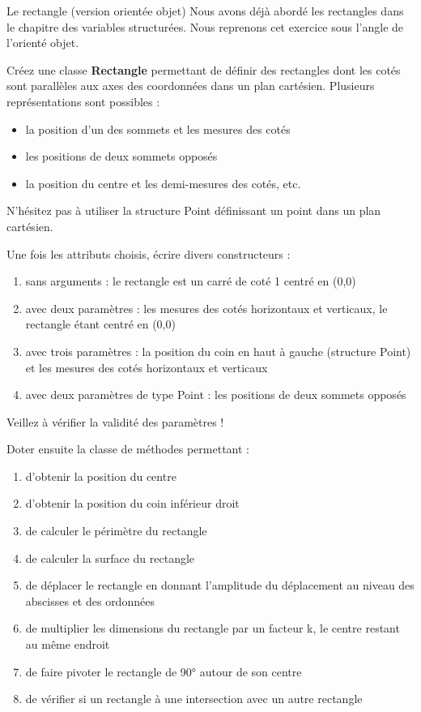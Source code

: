 \begin{Exercice}{Le rectangle (version orientée objet)}
	Nous avons déjà abordé les rectangles dans le chapitre des variables
	structurées. Nous reprenons cet exercice sous l’angle de l’orienté
	objet.

	Créez une classe \textbf{Rectangle}
	permettant de définir des rectangles dont les cotés sont parallèles aux
	axes des coordonnées dans un plan cartésien. Plusieurs représentations
	sont possibles :

	\liststyleListi
	\begin{itemize}
		\item 
			la position d’un des sommets et les mesures des cotés
		\item 
			les positions de deux sommets opposés
		\item 
			la position du centre et les demi-mesures des cotés, etc.
	\end{itemize}

	N’hésitez pas à utiliser la structure Point définissant un point dans un
	plan cartésien.

	Une fois les attributs choisis, écrire divers constructeurs :

	\begin{enumerate}[label=\alph*)]
		\item 
			sans arguments : le rectangle est un carré de coté 1 centré en (0,0)
		\item
			avec deux paramètres : les mesures des cotés horizontaux et verticaux,
			le rectangle étant centré en (0,0)
		\item 
			avec trois paramètres : la position du coin en haut à gauche (structure
			Point) et les mesures des cotés horizontaux et verticaux 
		\item 
			avec deux paramètres de type Point : les positions de deux sommets
			opposés
	\end{enumerate}

	Veillez à vérifier la validité des paramètres !

	Doter ensuite la classe de méthodes permettant :

	\begin{enumerate}[label=\alph*)]
		\item 
			d’obtenir la position du centre
		\item 
			d’obtenir la position du coin inférieur droit
		\item 
			de calculer le périmètre du rectangle
		\item 
			de calculer la surface du rectangle
		\item 
			de déplacer le rectangle en donnant l’amplitude du déplacement au niveau
			des abscisses et des ordonnées
		\item 
			de multiplier les dimensions du rectangle par un facteur k, le centre
			restant au même endroit
		\item 
			de faire pivoter le rectangle de 90° autour de son centre
		\item 
			de vérifier si un rectangle à une intersection avec un autre rectangle
	\end{enumerate}


\end{Exercice}

